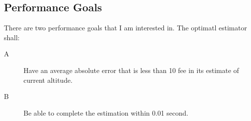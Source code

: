 \subsection{Performance Goals} \label{subsec:perfgoals}

There are two performance goals that I am interested in. The optimatl
estimator shall:
\begin{description}
\item [A] Have an average absolute error that is less than 10 fee in
  its estimate of current altitude. 
\item [B] Be able to complete the estimation within 0.01 second.
\end{description}
